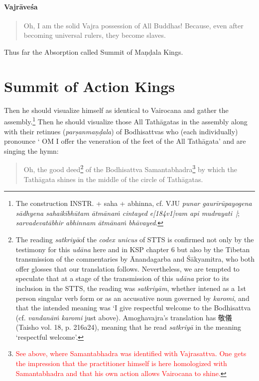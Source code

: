 \documentclass[11pt]{book}
\makeatletter
\def\fakesc#1{%
  \begingroup%
  \xdef\fake@name{\csname\curr@fontshape/\f@size\endcsname}%
  \fontsize{1.3\fontdimen8\fake@name}{\baselineskip}\selectfont%
  \uppercase{#1}%
  \endgroup%
}
\newcommand{\mantra}[1]{\fakesc{#1}}
\newcommand{\red}[1]{\textcolor{red}{#1}}
\newcommand{\skt}[1]{\emph{#1}}
\makeatother
\begin{document}
\paragraph{Vajrāveśa}

\begin{verse}
Oh, I am the solid Vajra possession of All Buddhas! Because, even after becoming universal rulers, they become slaves.
\end{verse}

Thus far the Absorption called Summit of Maṇḍala Kings.

\section{Summit of Action Kings}

Then he should visualize himself as identical to Vairocana and gather the assembly.\footnote{The construction INSTR. + saha + abhinna, cf. VJU \skt{punar gaurīrūpayogena sādhyena sahaikībhūtam ātmānaṁ cintayed e[184v1]vam api mudrayati~|}; \skt{sarvadevatābhir abhinnam ātmānaṁ bhāvayed}.} Then he should visualize those All Tathāgatas in the assembly along with their retinues (\skt{parṣanmaṇḍala}) of Bodhisattvas who (each individually) pronounce `\mantra{om} I offer the veneration of the feet of the All Tathāgata' and are singing the hymn:
 
 \begin{verse}
Oh, the good deed\footnote{The reading \skt{satkriyā}of the \skt{codex unicus} of STTS is confirmed not only by the testimony for this \skt{udāna} here and in KSP chapter 6 but also by the Tibetan transmission of the commentaries by Ānandagarba and Śākyamitra, who both offer glosses that our translation follows. Nevertheless, we are tempted to speculate that at a stage of the transmission of this \skt{udāna} prior to its inclusion in the STTS, the reading was \skt{satkriyām}, whether intened as a 1st person singular verb form or as an accusative noun governed by \skt{karomi}, and that the intended meaning was `I give respectful welcome to the Bodhisattva (cf. \skt{vandanāṁ karomi} just above). Amoghavajra's translation has 敬儀 (Taisho vol. 18, p. 216a24), meaning that he read \skt{satkriyā} in the meaning `respectful welcome'.} of the Bodhisattva Samantabhadra\footnote{\red{See above, where Samantabhadra was identified with Vajrasattva. One gets the impression that the practitioner himself is here homologized with Samantabhadra and that his own action allows Vairocana to shine.}} by which the Tathāgata shines in the middle of the circle of Tathāgatas.
\end{verse}
\end{document}
